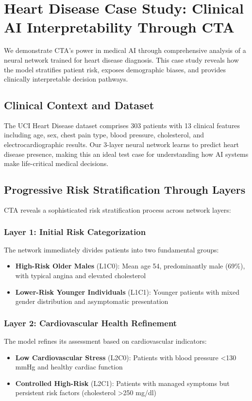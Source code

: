 \section{Heart Disease Case Study: Clinical AI Interpretability Through CTA}

We demonstrate CTA's power in medical AI through comprehensive analysis of a neural network trained for heart disease diagnosis. This case study reveals how the model stratifies patient risk, exposes demographic biases, and provides clinically interpretable decision pathways.

\subsection{Clinical Context and Dataset}

The UCI Heart Disease dataset comprises 303 patients with 13 clinical features including age, sex, chest pain type, blood pressure, cholesterol, and electrocardiographic results. Our 3-layer neural network learns to predict heart disease presence, making this an ideal test case for understanding how AI systems make life-critical medical decisions.

\subsection{Progressive Risk Stratification Through Layers}

CTA reveals a sophisticated risk stratification process across network layers:

\subsubsection{Layer 1: Initial Risk Categorization}
The network immediately divides patients into two fundamental groups:
\begin{itemize}
    \item \textbf{High-Risk Older Males} (L1C0): Mean age 54, predominantly male (69\%), with typical angina and elevated cholesterol
    \item \textbf{Lower-Risk Younger Individuals} (L1C1): Younger patients with mixed gender distribution and asymptomatic presentation
\end{itemize}

\subsubsection{Layer 2: Cardiovascular Health Refinement}
The model refines its assessment based on cardiovascular indicators:
\begin{itemize}
    \item \textbf{Low Cardiovascular Stress} (L2C0): Patients with blood pressure <130 mmHg and healthy cardiac function
    \item \textbf{Controlled High-Risk} (L2C1): Patients with managed symptoms but persistent risk factors (cholesterol >250 mg/dl)
\end{itemize}


